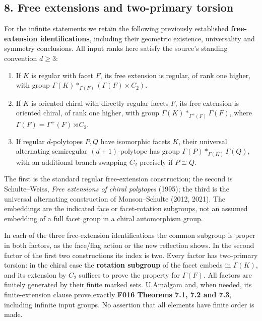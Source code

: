 \documentclass[
  11pt,
  a4paper,
]{article}
\providecommand{\tightlist}{%
  \setlength{\itemsep}{0pt}\setlength{\parskip}{0pt}}
\begin{document}
\subsection{8. Free extensions and two-primary
torsion}\label{free-extensions-and-two-primary-torsion}

For the infinite statements we retain the following previously
established \textbf{free-extension identifications}, including their
geometric existence, universality and symmetry conclusions. All input
ranks here satisfy the source's standing convention \(d\ge3\):

\begin{enumerate}
\def\labelenumi{\arabic{enumi}.}
\tightlist
\item
  If \(K\) is regular with facet \(F\), its free extension is regular,
  of rank one higher, with group
  \(\Gamma(K)*_{\Gamma(F)}(\Gamma(F)\times C_2)\).
\item
  If \(K\) is oriented chiral with directly regular facets \(F\), its
  free extension is oriented chiral, of rank one higher, with group
  \(\Gamma(K)*_{\Gamma^+(F)}\Gamma(F)\), where
  \(\Gamma(F)=\Gamma^+(F)\rtimes C_2\).
\item
  If regular \(d\)-polytopes \(P,Q\) have isomorphic facets \(K\), their
  universal alternating semiregular \((d+1)\)-polytope has group
  \(\Gamma(P)*_{\Gamma(K)}\Gamma(Q)\), with an additional
  branch-swapping \(C_2\) precisely if \(P\cong Q\).
\end{enumerate}

The first is the standard regular free-extension construction; the
second is Schulte--Weiss, \emph{Free extensions of chiral polytopes}
(1995); the third is the universal alternating construction of
Monson--Schulte (2012, 2021). The embeddings are the indicated face or
facet-rotation subgroups, not an assumed embedding of a full facet group
in a chiral automorphism group.

In each of the three free-extension identifications the common subgroup
is proper in both factors, as the face/flag action or the new reflection
shows. In the second factor of the first two constructions its index is
two. Every factor has two-primary torsion: in the chiral case the
\textbf{rotation subgroup} of the facet embeds in \(\Gamma(K)\), and its
extension by \(C_2\) suffices to prove the property for \(\Gamma(F)\).
All factors are finitely generated by their finite marked sets.
U.Amalgam and, when needed, its finite-extension clause prove exactly
\textbf{F016 Theorems 7.1, 7.2 and 7.3}, including infinite input
groups. No assertion that all elements have finite order is made.
\end{document}
